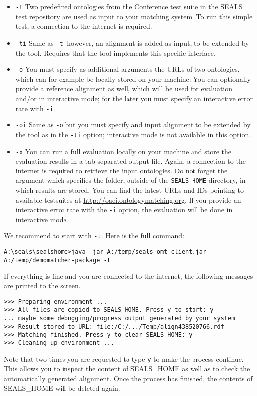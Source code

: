 \documentclass{article}
\begin{document}
\begin{itemize}
	\item \verb|-t| Two predefined ontologies from the Conference test suite in the SEALS test repository are used as input to your matching system. To run this simple test, a connection to the internet is required.
	\item \verb|-ti| Same as \verb|-t|, however, an alignment is added as input, to be extended by the tool. Requires that the tool implements this specific interface.
	\item \verb|-o| You must specify as additional arguments the URLs of two ontologies, which can for example be locally stored on your machine. You can optionally provide a reference alignment as well, which will be used for evaluation and/or in interactive mode; for the later you must specify an interactive error rate with \verb|-i|.
	\item \verb|-oi| Same as \verb|-o| but you must specify and input alignment to be extended by the tool as in the \verb|-ti| option; interactive mode is not available in this option.
	\item \verb|-x| You can run a full evaluation locally on your machine and store the evaluation results in a tab-separated output file. Again, a connection to the internet is required to retrieve the input ontologies. Do not forget the argument which specifies the folder, outside of the \verb|SEALS_HOME| directory, in which results are stored. You can find the latest URLs and IDs pointing to available testsuites at \url{http://oaei.ontologymatching.org}. If you provide an interactive error rate with the \verb|-i| option, the evaluation will be done in interactive mode.
\end{itemize}

We recommend to start with \verb|-t|. Here is the full command:
\begin{verbatim}
A:\seals\sealshome>java -jar A:/temp/seals-omt-client.jar
A:/temp/demomatcher-package -t
\end{verbatim}
If everything is fine and you are connected to the internet, the following messages are printed to the screen.
\begin{verbatim}
>>> Preparing environment ...
>>> All files are copied to SEALS_HOME. Press y to start: y
... maybe some debugging/progress output generated by your system
>>> Result stored to URL: file:/C:/.../Temp/align438520766.rdf
>>> Matching finished. Press y to clear SEALS_HOME: y
>>> Cleaning up environment ...
\end{verbatim}
Note that two times you are requested to type \verb|y| to make the process continue. This allows you to inspect the content of SEALS\_HOME as well as to check the automatically generated alignment. Once the process has finished, the contents of SEALS\_HOME will be deleted again.
\end{document}
